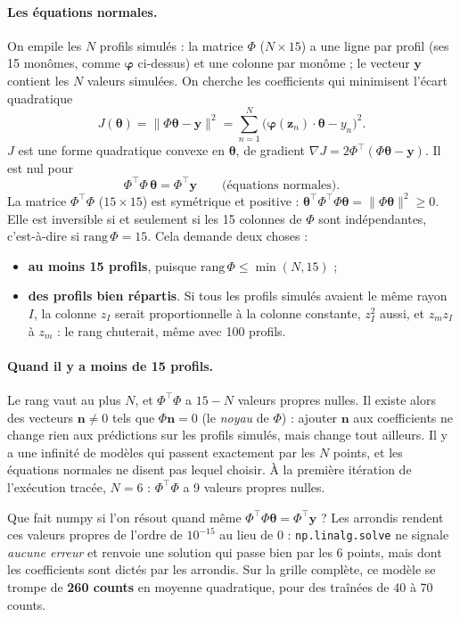 \paragraph{Les équations normales.} On empile les $N$ profils simulés : la matrice $\Phi$ ($N\times15$) a une ligne par profil (ses 15 monômes, comme $\boldsymbol\varphi$ ci-dessus) et une colonne par monôme ; le vecteur $\mathbf y$ contient les $N$ valeurs simulées. On cherche les coefficients qui minimisent l'écart quadratique
\[ J(\boldsymbol\theta)=\|\Phi\boldsymbol\theta-\mathbf y\|^2=\sum_{n=1}^N\big(\boldsymbol\varphi(\mathbf z_n)\cdot\boldsymbol\theta-y_n\big)^2. \]
$J$ est une forme quadratique convexe en $\boldsymbol\theta$, de gradient $\nabla J=2\Phi^\top(\Phi\boldsymbol\theta-\mathbf y)$. Il est nul pour
\[ \Phi^\top\Phi\,\boldsymbol\theta=\Phi^\top\mathbf y\qquad\text{(équations normales)}. \]
La matrice $\Phi^\top\Phi$ ($15\times15$) est symétrique et positive : $\boldsymbol\theta^\top\Phi^\top\Phi\boldsymbol\theta=\|\Phi\boldsymbol\theta\|^2\ge0$. Elle est inversible si et seulement si les 15 colonnes de $\Phi$ sont indépendantes, c'est-à-dire si $\mathrm{rang}\,\Phi=15$. Cela demande deux choses :
\begin{itemize}
\item \textbf{au moins 15 profils}, puisque $\mathrm{rang}\,\Phi\le\min(N,15)$ ;
\item \textbf{des profils bien répartis}. Si tous les profils simulés avaient le même rayon $I$, la colonne $z_I$ serait proportionnelle à la colonne constante, $z_I^2$ aussi, et $z_mz_I$ à $z_m$ : le rang chuterait, même avec 100 profils.
\end{itemize}

\paragraph{Quand il y a moins de 15 profils.} Le rang vaut au plus $N$, et $\Phi^\top\Phi$ a $15-N$ valeurs propres nulles. Il existe alors des vecteurs $\mathbf n\neq0$ tels que $\Phi\mathbf n=0$ (le \emph{noyau} de $\Phi$) : ajouter $\mathbf n$ aux coefficients ne change rien aux prédictions sur les profils simulés, mais change tout ailleurs. Il y a une infinité de modèles qui passent exactement par les $N$ points, et les équations normales ne disent pas lequel choisir. À la première itération de l'exécution tracée, $N=6$ : $\Phi^\top\Phi$ a 9 valeurs propres nulles.

Que fait numpy si l'on résout quand même $\Phi^\top\Phi\boldsymbol\theta=\Phi^\top\mathbf y$ ? Les arrondis rendent ces valeurs propres de l'ordre de $10^{-15}$ au lieu de 0 : \texttt{np.linalg.solve} ne signale \emph{aucune erreur} et renvoie une solution qui passe bien par les 6 points, mais dont les coefficients sont dictés par les arrondis. Sur la grille complète, ce modèle se trompe de \textbf{260 counts} en moyenne quadratique, pour des traînées de 40 à 70 counts.

